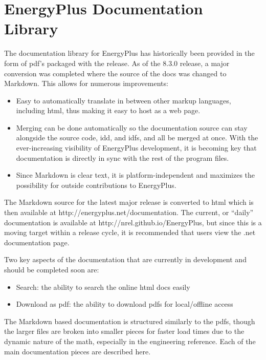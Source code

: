 \section{EnergyPlus Documentation Library}\label{energyplus-documentation-library}

The documentation library for EnergyPlus has historically been provided in the form of pdf's packaged with the release. As of the 8.3.0 release, a major conversion was completed where the source of the docs was changed to Markdown. This allows for numerous improvements:

\begin{itemize}
\tightlist
\item
  Easy to automatically translate in between other markup languages, including html, thus making it easy to host as a web page.
\item
  Merging can be done automatically so the documentation source can stay alongside the source code, idd, and idfs, and all be merged at once. With the ever-increasing visibility of EnergyPlus development, it is becoming key that documentation is directly in sync with the rest of the program files.
\item
  Since Markdown is clear text, it is platform-independent and maximizes the possibility for outside contributions to EnergyPlus.
\end{itemize}

The Markdown source for the latest major release is converted to html which is then available at http://energyplus.net/documentation. The current, or ``daily'' documentation is available at http://nrel.github.io/EnergyPlus, but since this is a moving target within a release cycle, it is recommended that users view the .net documentation page.

Two key aspects of the documentation that are currently in development and should be completed soon are:

\begin{itemize}
\tightlist
\item
  Search: the ability to search the online html docs easily
\item
  Download as pdf: the ability to download pdfs for local/offline access
\end{itemize}

The Markdown based documentation is structured similarly to the pdfs, though the larger files are broken into smaller pieces for faster load times due to the dynamic nature of the math, especially in the engineering reference. Each of the main documentation pieces are described here.

